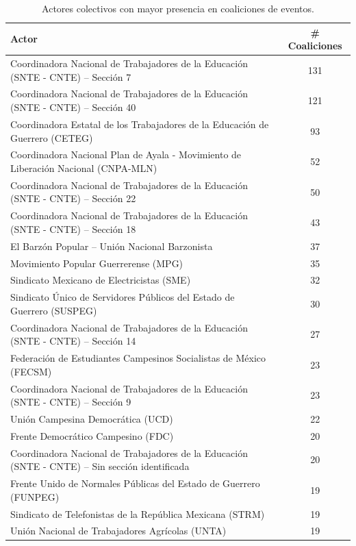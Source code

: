 \documentclass[letterpaper, 11pt]{book}
\theoremstyle{definition}
\theoremstyle{remark}
\begin{document}
\begin{table}[!hbt]
\center
\scriptsize
\caption{Actores colectivos con mayor presencia en coaliciones de eventos.}
\label{Actores_con_mayorPresencia}
\begin{tabular}{ | l | c | } 
\hline
\hspace{19em} \textbf{Actor} & \textbf{\# Coaliciones}\\
\hline
Coordinadora Nacional de Trabajadores de la Educación (SNTE - CNTE) -- Sección 7 & 131\\
\hline
Coordinadora Nacional de Trabajadores de la Educación (SNTE - CNTE) -- Sección 40 & 121\\
\hline
Coordinadora Estatal de los Trabajadores de la Educación de Guerrero (CETEG) & 93\\
\hline
Coordinadora Nacional Plan de Ayala - Movimiento de Liberación Nacional (CNPA-MLN) & 52\\
\hline
Coordinadora Nacional de Trabajadores de la Educación (SNTE - CNTE) -- Sección 22 & 50\\
\hline
Coordinadora Nacional de Trabajadores de la Educación (SNTE - CNTE) -- Sección 18 & 43\\
\hline
El Barzón Popular -- Unión Nacional Barzonista & 37\\
\hline
Movimiento Popular Guerrerense (MPG) & 35\\
\hline
Sindicato Mexicano de Electricistas (SME) & 32\\
\hline
Sindicato Único de Servidores Públicos del Estado de Guerrero (SUSPEG) & 30\\
\hline
Coordinadora Nacional de Trabajadores de la Educación (SNTE - CNTE) -- Sección 14 & 27\\
\hline
Federación de Estudiantes Campesinos Socialistas de México (FECSM) & 23\\
\hline
Coordinadora Nacional de Trabajadores de la Educación (SNTE - CNTE) -- Sección 9 & 23\\
\hline
Unión Campesina Democrática (UCD) & 22\\
\hline
Frente Democrático Campesino (FDC) & 20\\
\hline
Coordinadora Nacional de Trabajadores de la Educación (SNTE - CNTE) -- Sin sección identificada & 20\\
\hline
Frente Unido de Normales Públicas del Estado de Guerrero (FUNPEG) & 19\\
\hline
Sindicato de Telefonistas de la República Mexicana (STRM) & 19\\
\hline
Unión Nacional de Trabajadores Agrícolas (UNTA) & 19\\

\end{tabular}
\end{table}
\end{document}
